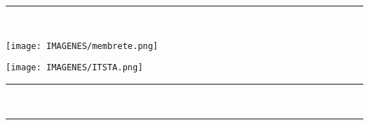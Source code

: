 	\begin{minipage}[c]{16cm}
		\centering
		\rule{16cm}{10pt}
	\end{minipage}\\[0.20cm]
	\begin{minipage}[c]{16cm}
		\centering
		\texttt{[image: IMAGENES/membrete.png]}
	\end{minipage}
	
	

	\vspace*{\baselineskip} %

	\begin{minipage}[c]{3cm}
		\noindent\centering\texttt{[image: IMAGENES/ITSTA.png]}
	\end{minipage}
	\begin{minipage}[c]{13cm}
		\centering\bf\fontsize{14}{0} {
			\selectfont {
				INSTITUTO TECNOLÓGICO SUPERIOR DE TANTOYUCA
			}
		}
		\rule{11cm}{7pt}\\[-0.5\baselineskip]
		\rule{11cm}{3pt}
	\end{minipage}

	\vspace*{\baselineskip}

